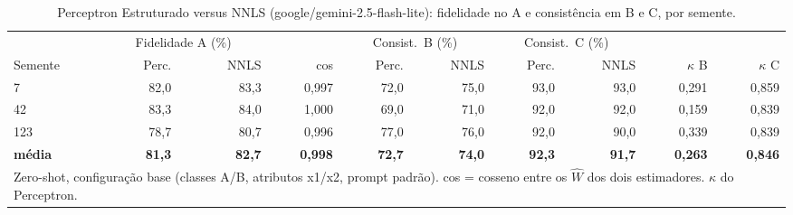 \begin{table}[htbp]
\centering
\small
\caption{Perceptron Estruturado versus NNLS (google/gemini-2.5-flash-lite): fidelidade no A e consistência em B e C, por semente.}
\label{tab:bloco1_A_perceptron_vs_nnls_por_semente_flashlite}
\begin{tabular}{lrrrrrrrrr}
\toprule
 & \multicolumn{2}{c}{Fidelidade A (\%)} &  & \multicolumn{2}{c}{Consist.\ B (\%)} & \multicolumn{2}{c}{Consist.\ C (\%)} &  &  \\ \cmidrule(lr){2-3} \cmidrule(lr){5-6} \cmidrule(lr){7-8}
Semente & Perc. & NNLS & cos & Perc. & NNLS & Perc. & NNLS & $\kappa$ B & $\kappa$ C \\
\midrule
7 & 82,0 & 83,3 & 0,997 & 72,0 & 75,0 & 93,0 & 93,0 & 0,291 & 0,859 \\
42 & 83,3 & 84,0 & 1,000 & 69,0 & 71,0 & 92,0 & 92,0 & 0,159 & 0,839 \\
123 & 78,7 & 80,7 & 0,996 & 77,0 & 76,0 & 92,0 & 90,0 & 0,339 & 0,839 \\
\midrule
\textbf{média} & \textbf{81,3} & \textbf{82,7} & \textbf{0,998} & \textbf{72,7} & \textbf{74,0} & \textbf{92,3} & \textbf{91,7} & \textbf{0,263} & \textbf{0,846} \\
\bottomrule
\multicolumn{10}{p{0.95\linewidth}}{\footnotesize Zero-shot, configuração base (classes A/B, atributos x1/x2, prompt padrão). cos = cosseno entre os $\hat{W}$ dos dois estimadores. $\kappa$ do Perceptron.} \\
\end{tabular}
\end{table}
